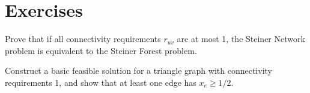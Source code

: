\section{Exercises}
\begin{exercise}
Prove that if all connectivity requirements $r_{uv}$ are at most 1, the Steiner Network problem is equivalent to the Steiner Forest problem.
\end{exercise}
\begin{exercise}
Construct a basic feasible solution for a triangle graph with connectivity requirements 1, and show that at least one edge has $x_e \ge 1/2$.
\end{exercise}

